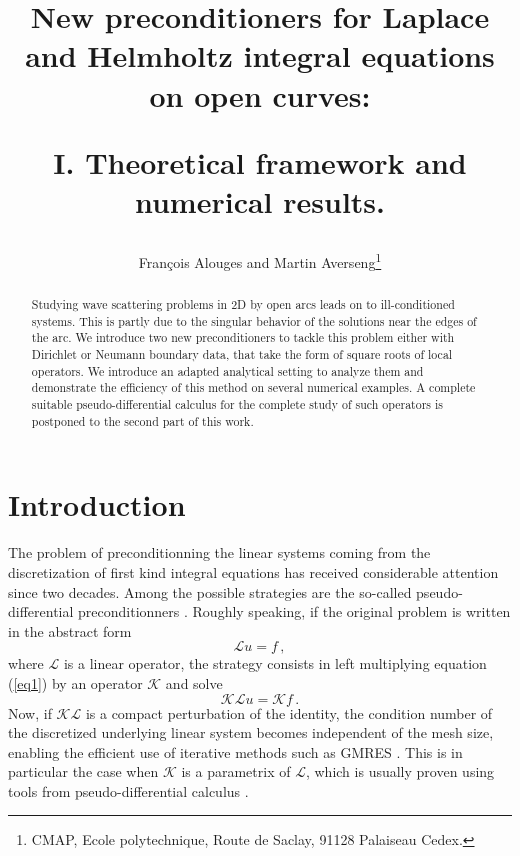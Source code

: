 \documentclass[a4paper]{article}
\title{New preconditioners for Laplace and Helmholtz integral equations on open curves: \\
	\vspace{0,5cm}
	\begin{Large}
		I. Theoretical framework and numerical results. 
	\end{Large}}
\author{Fran\c{c}ois Alouges and Martin Averseng\footnote{CMAP, Ecole polytechnique, Route de Saclay, 91128 Palaiseau Cedex.}}
\begin{document}
\maketitle

\begin{abstract}
Studying wave scattering problems in 2D by open arcs leads on to ill-conditioned systems. This is partly due to the singular behavior
of the solutions near the edges of the arc. We introduce two new preconditioners to tackle this problem either with Dirichlet or Neumann 
boundary data, that take the form of square roots of local operators. We introduce an adapted analytical setting to analyze them and 
demonstrate the efficiency of this method on several numerical examples. A complete suitable pseudo-differential calculus for the
complete study of such operators is postponed to the second part of this work.
\end{abstract}

\section{Introduction}

The problem of preconditionning the linear systems coming from the discretization of first kind integral equations
has received considerable attention since two decades. Among the possible strategies are the so-called pseudo-differential 
preconditionners \cite{alouges2007stable,alouges2005new,antoine2007generalized,christiansen2002preconditioner,hiptmair2014mesh,Steinbach98}. 
Roughly speaking, if the original problem is written in the abstract form
\begin{equation}
	\mathcal{L}u=f\,,
	\label{eq1}
\end{equation}
where $\mathcal{L}$ is a linear operator, the strategy consists in left multiplying equation (\ref{eq1}) by an operator $\mathcal{K}$ and solve
\begin{equation}
	\mathcal{K}\mathcal{L}u=\mathcal{K}f\,.	
\end{equation}
Now, if $\mathcal{K}\mathcal{L}$ is a compact perturbation of the identity, the condition number of the discretized underlying linear system 
becomes independent of the mesh size, enabling the efficient use of iterative methods such as GMRES \cite{saad1986gmres}. This is in particular the 
case when $\mathcal{K}$ is a parametrix of $\mathcal{L}$, which is usually proven using tools from pseudo-differential calculus 
\cite{steinbach1998construction}.
\end{document}
